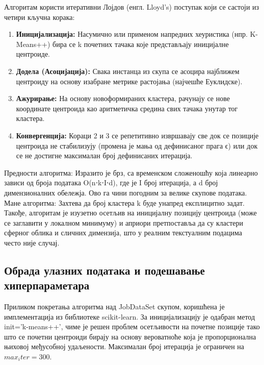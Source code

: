\documentclass[a4paper,12pt]{report}
\begin{document}
	Алгоритам користи итеративни Лојдов (енгл. Lloyd's) поступак који се састоји из четири кључна корака:
	
	\begin{enumerate}
	
	
	\item \textbf{Иницијализација:} Насумично или применом напредних хеуристика (нпр. K-Means++) бира се k почетних тачака које представљају иницијалне центроиде.
	
	\item \textbf{Додела (Асоцијација):} Свака инстанца из скупа се асоцира најближем центроиду на основу изабране метрике растојања (најчешће Еуклидске).
	
	\item \textbf{Ажурирање:} На основу новоформираних кластера, рачунају се нове координате центроида као аритметичка средина свих тачака унутар тог кластера.
	
	\item \textbf{Конвергенција:} Кораци 2 и 3 се репетитивно извршавају све док се позиције центроида не стабилизују (промена је мања од дефинисаног прага ϵ) или док се не достигне максималан број дефинисаних итерација.
	
	\end{enumerate}
	
	Предности алгоритма: Изразито је брз, са временском сложеношћу која линеарно зависи од броја података O(n⋅k⋅I⋅d), где је I број итерација, а d број димензионалних обележја. Ово га чини погодним за велике скупове података.
	Мане алгоритма: Захтева да број кластера k буде унапред експлицитно задат. Такође, алгоритам је изузетно осетљив на иницијалну позицију центроида (може се заглавити у локалном минимуму) и априори претпоставља да су кластери сферног облика и сличних димензија, што у реалним текстуалним подацима често није случај.

	\subsection{Обрада улазних података и подешавање хиперпараметара}
	
	Приликом покретања алгоритма над JobDataSet скупом, коришћена је имплементација из библиотеке scikit-learn. За иницијализацију је одабран метод init='k-means++', чиме је решен проблем осетљивости на почетне позиције тако што се почетни центроиди бирају на основу вероватноће која је пропорционална њиховој међусобној удаљености. Максималан број итерација је ограничен на $ max_iter=300. $
	
\end{document}
